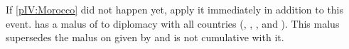 
\effetlong
\aparag If \ref{pIV:Morocco} did not happen yet, apply it immediately in
addition to this event.
\aparag \TUR has a malus of  to diplomacy with all
 countries (\paysCyrenaique, \paysTripoli, \paysTunisie,
\paysAlgerie and \paysMaroc).
\bparag This malus supersedes the malus on \paysmaroc given by
 and is not cumulative with it.

\stopevents


